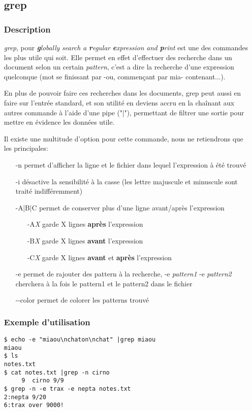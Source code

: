 \subsection*{grep}
\subsubsection*{Description}
\emph{grep}, pour \emph{\textbf{g}lobally search a \textbf{r}egular \textbf{e}xpression and \textbf{p}rint} est une des commandes les plus utile qui soit.
Elle permet en effet d'effectuer des recherche dans un document selon un certain \emph{pattern}, c'est a dire la recherche d'une expression quelconque (mot se finissant par -ou, commençant par mia- contenant...).

En plus de pouvoir faire ces recherches dans les documents, grep peut aussi en faire sur l'entrée standard, et son utilité en deviens accru en la chaînant aux autres commande à l'aide d'une pipe ("|"), permettant de filtrer une sortie pour mettre en évidence les données utile.

Il existe une multitude d'option pour cette commande, nous ne retiendrons que les principales:
\begin{itemize}
\item[-n] permet d'afficher la ligne et le fichier dans lequel l'expression à été trouvé
\item[-i] désactive la sensibilité à la casse (les lettre majuscule et minuscule sont traité indifféremment)
\item[-A|B|C] permet de conserver plus d'une ligne avant/après l'expression
	\begin{itemize}
		\item[-A\emph{X}] garde X lignes \textbf{après} l'expression
		\item[-B\emph{X}] garde X lignes \textbf{avant} l'expression
		\item[-C\emph{X}] garde X lignes \textbf{avant} et \textbf{après} l'expression
	\end{itemize}
\item[-e] permet de rajouter des pattern à la recherche, -e \emph{pattern1} -e \emph{pattern2} cherchera à la fois le pattern1 et le pattern2 dans le fichier
\item[-{}-color] permet de colorer les patterns trouvé
\end{itemize}

\subsubsection*{Exemple d'utilisation}

\begin{lstlisting}
$ echo -e "miaou\nchaton\nchat" |grep miaou
miaou
$ ls
notes.txt
$ cat notes.txt |grep -n cirno
     9  cirno 9/9
$ grep -n -e trax -e nepta notes.txt
2:nepta 9/20
6:trax over 9000!
\end{lstlisting}
